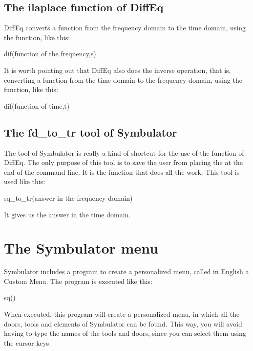 \subsection{The ilaplace function of DiffEq}

DiffEq converts a function from the frequency domain to the time
domain, using the  function, like this:

\begin{entry}
dif\ilaplace(function of the frequency,s)
\end{entry}

It is worth pointing out that DiffEq also does the inverse
operation, that is, converting a function from the time domain to
the frequency domain, using the  function, like this:

\begin{entry}
dif\laplace(function of time,t)
\end{entry}

\subsection{The fd\_to\_tr tool of Symbulator}

The  tool of Symbulator is really a kind of
shortcut for the use of the  function of DiffEq. The
only purpose of this tool is to save the user from placing the
 at the end of the command line. It is the 
function that does all the work. This tool is used like this:

\begin{entry}
sq\fd_to_tr(answer in the frequency domain)
\end{entry}

It gives us the answer in the time domain.

\section{The Symbulator menu}

Symbulator includes a program to create a personalized menu, called
in English a Custom Menu. The program is executed like this:

\begin{entry}
sq\makemenu()
\end{entry}

When executed, this program will create a personalized menu, in
which all the doors, tools and elements of Symbulator can be found.
This way, you will avoid having to type the names of the tools and
doors, since you can select them using the cursor keys.

